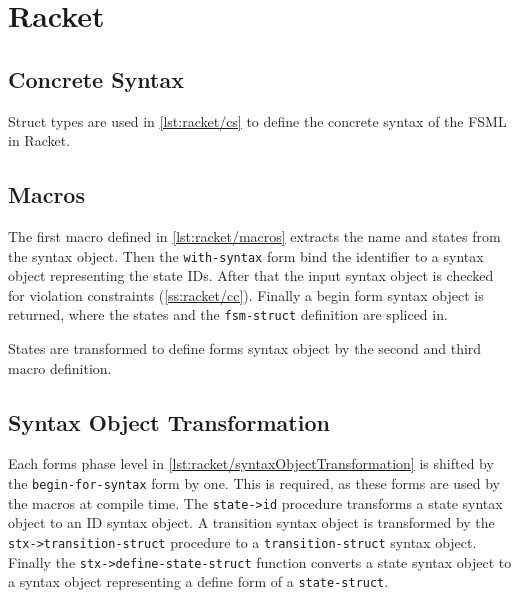 \section{Racket}
\label{s:racket}
\lstset{language=lisp}

\subsection{Concrete Syntax}

Struct types are used in \autoref{lst:racket/cs} to define the concrete syntax of the FSML in Racket.



\subsection{Macros}

The first macro defined in \autoref{lst:racket/macros} extracts the name and states from the syntax object.
Then the \lstinline{with-syntax} form bind the identifier to a syntax object representing the state IDs.
After that the input syntax object is checked for violation constraints (\autoref{ss:racket/cc}).
Finally a begin form syntax object is returned, where the states and the \lstinline{fsm-struct} definition are spliced in.

States are transformed to define forms syntax object by the second and third macro definition.



\subsection{Syntax Object Transformation}

Each forms phase level in \autoref{lst:racket/syntaxObjectTransformation} is shifted by the \lstinline{begin-for-syntax} form by one.
This is required, as these forms are used by the macros at compile time.
The \lstinline{state->id} procedure transforms a state syntax object to an ID syntax object.
A transition syntax object is transformed by the \lstinline{stx->transition-struct} procedure to a \lstinline{transition-struct} syntax object.
Finally the \lstinline{stx->define-state-struct} function converts a state syntax object to a syntax object representing a define form of a \lstinline{state-struct}.

